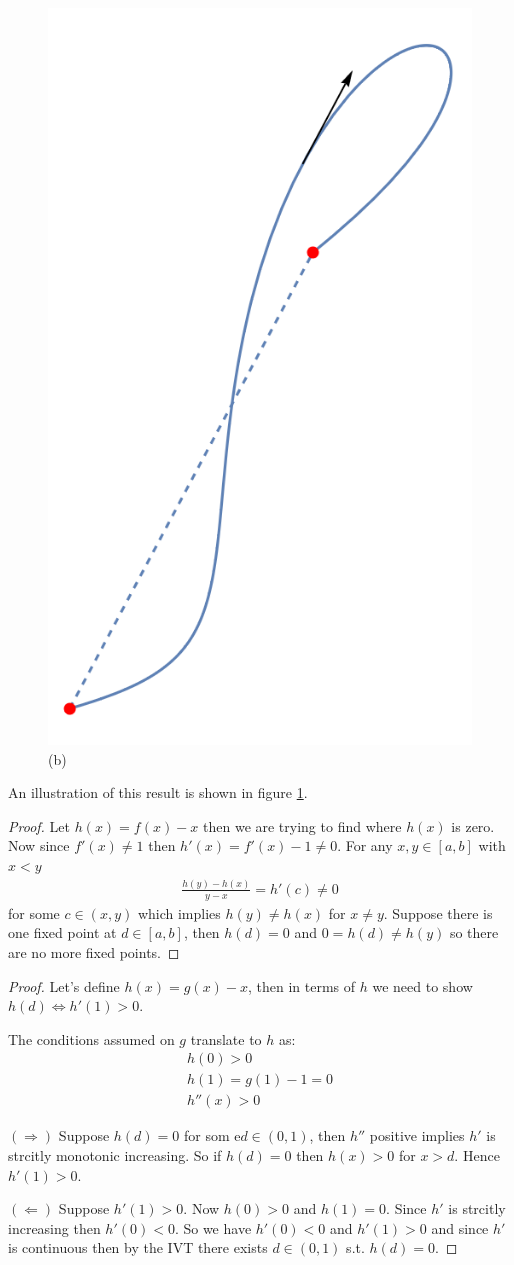 \begin{enumerate}[label=(\alph*)]
    \begin{figure}
        \centering
        \includegraphics[width=.2\textwidth]{5 The Derivative/Exercise 5.3.4/Exercise 5.3.4 (b).png}
        \caption{ (b) \label{fig:Ex_3_4_b}}
    \end{figure}
    An illustration of this result is shown in figure \ref{fig:Ex_3_4_b}.
\end{enumerate}

\begin{proof}
    Let $h(x)=f(x)-x$ then we are trying to find where 
    $h(x)$ is zero. Now since $f'(x)\neq 1$ then 
    $h'(x) = f'(x)-1 \neq 0$. For any $x,y \in [a,b]$ with 
    $x<y$
    \begin{align*}
        \frac{h(y)-h(x)}{y-x} = h'(c) \neq 0
    \end{align*}
    for some $c \in (x,y)$ which implies $h(y) \neq h(x)$ for 
    $x\neq y$. Suppose there is one fixed point at $d \in [a,b]$,
    then $h(d)=0$ and $0=h(d)\neq h(y)$ so there are no more fixed 
    points.
\end{proof}

\begin{proof}
    Let's define $h(x)=g(x)-x$, then in terms of
    $h$ we need to show $h(d) \Leftrightarrow h'(1)>0$. 

    The conditions assumed on $g$ translate to $h$ as:
    \begin{gather*}
        h(0)>0 \\
        h(1) = g(1)-1=0 \\
        h''(x) > 0
    \end{gather*}

    $(\Rightarrow)$ Suppose $h(d)=0$ for som e$d\in (0,1)$, then 
    $h''$ positive implies $h'$ is strcitly monotonic increasing.
    So if $h(d)=0$ then $h(x)>0$ for $x>d$. Hence $h'(1)>0$.

    $(\Leftarrow)$ Suppose $h'(1)>0$. Now $h(0)>0$ and $h(1)=0$. Since 
    $h'$ is strcitly increasing then $h'(0)<0$. 
    So we have $h'(0)<0$ and $h'(1)>0$ and since $h'$ is continuous then 
    by the IVT there exists $d\in (0,1)$ s.t. $h(d)=0$.
\end{proof}

